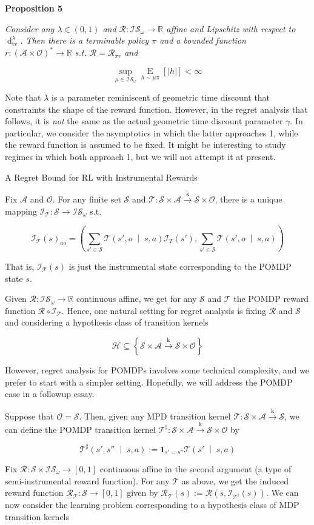 \documentclass[a4paper]{article}
\newcommand{\Co}[1]{}
\newcommand{\AP}[1]{\left(#1\right)}
\newcommand{\AB}[1]{\left[#1\right]}
\newcommand{\AC}[1]{\left\{#1\right\}}
\newcommand{\APM}[2]{\left(#1\;\middle\vert\;#2\right)}
\newcommand{\Ea}[2]{\underset{#1}{\operatorname{E}}\AB{#2}}
\newcommand{\Dtv}{\operatorname{d}_{\text{tv}}}
\newcommand{\Reals}{\mathbb{R}}
\newcommand{\Abs}[1]{\left\vert #1 \right\vert}
\newcommand{\K}{\xrightarrow{\mathrm{k}}}
\newcommand{\St}{\mathcal{S}}
\newcommand{\A}{\mathcal{A}}
\newcommand{\Ob}{\mathcal{O}}
\newcommand{\AO}{\AP{\A\times\Ob}}
\newcommand{\FH}{\AO^*}
\newcommand{\R}{\mathcal{R}}
\newcommand{\T}{\mathcal{T}}
\newcommand{\Hy}{\mathcal{H}}
\newcommand{\In}{\mathcal{I}}
\newcommand{\IS}{\mathcal{IS}}
\begin{document}
\textbf{Proposition 5}\Co{b}

\textit{Consider any $\lambda\in(0,1)$ and $\R:\IS_\omega\rightarrow\Reals$ affine and Lipschitz with respect to $\Dtv^\lambda$. Then there is a terminable policy $\pi$ and a bounded function $r:\FH\rightarrow\Reals$ s.t. $\R=\R_{\pi r}$ and}\Co{i}

$$\sup_{\mu\in\IS_\omega}\Ea{h\sim\mu\pi}{\Abs{h}} < \infty$$

Note that $\lambda$ is a parameter reminiscent of geometric time discount that constraints the shape of the reward function. However, in the regret analysis that follows, it is \textit{not}\Co{i} the same as the actual geometric time discount parameter $\gamma$. In particular, we consider the asymptotics in which the latter approaches 1, while the reward function is assumed to be fixed. It might be interesting to study regimes in which both approach 1, but we will not attempt it at present.

\begin{Large}A Regret Bound for RL with Instrumental Rewards\end{Large}

Fix $\A$ and $\Ob$. For any finite set $\St$ and $\T:\St\times\A\K\St\times\Ob$, there is a unique mapping $\In_\T:\St\rightarrow\IS_{\omega}$ s.t. 

$$\In_\T(s)_{ao}=\AP{\sum_{s'\in\St}\T\APM{s',o}{s,a}\In_T\AP{s'},\sum_{s'\in\St}\T\APM{s',o}{s,a}}$$

That is, $\In_\T(s)$ is just the instrumental state corresponding to the POMDP state $s$.

Given $\R:\IS_\omega\rightarrow\Reals$ continuous affine, we get for any $\St$ and $\T$ the POMDP reward function $\R\circ\In_\T$. Hence, one natural setting for regret analysis is fixing $\R$ and $\St$ and considering a hypothesis class of transition kernels

$$\Hy\subseteq\AC{\St\times\A\K\St\times\Ob}$$

However, regret analysis for POMDPs involves some technical complexity, and we prefer to start with a simpler setting. Hopefully, we will address the POMDP case in a followup essay.

Suppose that $\Ob=\St$. Then, given any MPD transition kernel $\T:\St\times\A\K\St$, we can define the POMDP transition kernel $\T^\sharp:\St\times\A\K\St\times\Ob$ by

$$\T^\sharp\APM{s',s''}{s,a}:=\boldsymbol{1}_{s'=s''}\T\APM{s'}{s,a}$$

Fix $\R:\St\times\IS_\omega\rightarrow[0,1]$ continuous affine in the second argument (a type of semi-instrumental reward function). For any $\T$ as above, we get the induced reward function $\R_\T:\St\rightarrow[0,1]$ given by $\R_\T(s):=\R\AP{s,\In_{\T^\sharp}(s)}$. We can now consider the learning problem corresponding to a hypothesis class of MDP transition kernels
\end{document}
